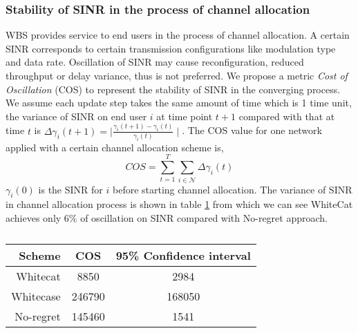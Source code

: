 \subsubsection{Stability of SINR in the process of channel allocation}
WBS provides service to end users in the process of channel allocation. 
A certain SINR corresponds to certain transmission configurations like modulation type and data rate. Oscillation of SINR may cause reconfiguration, reduced throughput or delay variance, thus is not preferred. We propose a metric \textit{Cost of Oscillation} (COS) to represent the stability of SINR in the converging process. We assume each update step takes the same amount of time which is 1 time unit, the variance of SINR on end user $i$ at time point $t+1$ compared with that at time $t$ is $\varDelta  \gamma_i(t+1)=\mid\frac{\gamma_i(t+1)-\gamma_i(t)}{\gamma_i(t)} \mid$. The COS value for one network applied with a certain channel allocation scheme is,
\begin{equation}
\label{cos}
			COS = \sum\limits_{t=1}^T   \sum\limits_{i\in \mathcal{N}} \varDelta  \gamma_i(t)
			\end{equation}
$\gamma_i(0)$ is the SINR for $i$ before starting channel allocation. The variance of SINR in channel allocation process is shown in table \ref{costable} from which we can see WhiteCat achieves only 6\% of oscillation on SINR compared with No-regret approach.
\begin{table}[!h]
\caption{}\label{costable}
\centering
\begin{tabular}{|r|c|c|}
  \hline
  Scheme			 						& COS 					& 95\% Confidence interval\\
    \hline
  Whitecat									& 8850					& 2984\\
  Whitecase 								& 246790 				& 168050\\ %
  No-regret									& 145460				& 1541\\
  \hline
\end{tabular}
\end{table}



